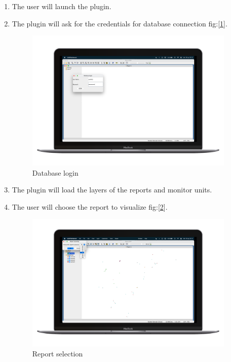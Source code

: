 \begin{enumerate}
    \item The user will launch the plugin.
    \item The plugin will ask for the credentials for database connection fig:[\ref{optuTorial1}]. 
    \begin{figure}[H]
        \centering
        \includegraphics[width=27em]{img/op1.png} \caption{Database login} \label{optuTorial1}
    \end{figure}
    \item The plugin will load the layers of the reports and monitor units.
    \item The user will choose the report to visualize fig:[\ref{optuTorial2}].
    \begin{figure}[H]
        \centering
        \includegraphics[width=27em]{img/op2.png} \caption{Report selection} \label{optuTorial2}
    \end{figure}


\end{enumerate}
